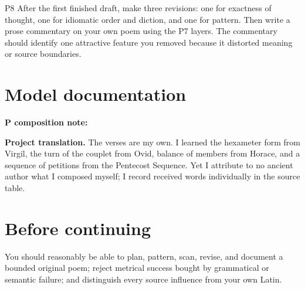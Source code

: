 \begin{courseunit}{P8}
After the first finished draft, make three revisions: one for exactness of
thought, one for idiomatic order and diction, and one for pattern. Then write a
prose commentary on your own poem using the P7 layers. The commentary should
identify one attractive feature you removed because it distorted meaning or
source boundaries.

\ifsolutions
\section{Model documentation}
\textbf{P composition note:} 

\textbf{Project translation.} The verses are my own. I learned the hexameter
form from Virgil, the turn of the couplet from Ovid, balance of members from
Horace, and a sequence of petitions from the Pentecost Sequence. Yet I
attribute to no ancient author what I composed myself; I record received words
individually in the source table.
\else
\section{Before continuing}
You should reasonably be able to plan, pattern, scan, revise, and document a
bounded original poem; reject metrical success bought by grammatical or
semantic failure; and distinguish every source influence from your own Latin.
\fi
\end{courseunit}
